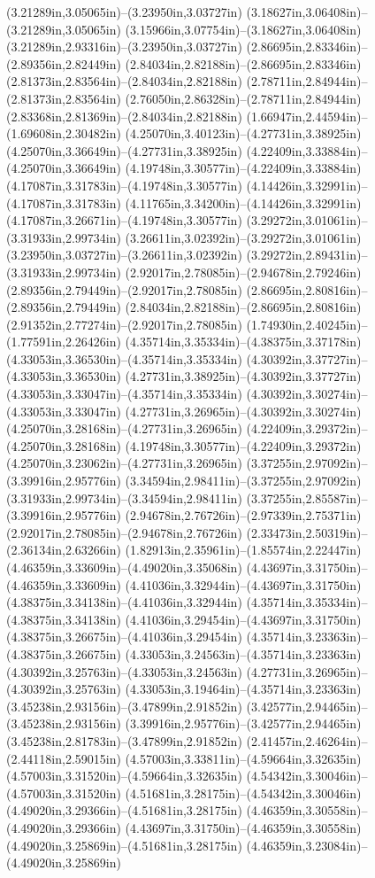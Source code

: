 (3.21289in,3.05065in)--(3.23950in,3.03727in) (3.18627in,3.06408in)--(3.21289in,3.05065in) (3.15966in,3.07754in)--(3.18627in,3.06408in) (3.21289in,2.93316in)--(3.23950in,3.03727in) (2.86695in,2.83346in)--(2.89356in,2.82449in) (2.84034in,2.82188in)--(2.86695in,2.83346in) (2.81373in,2.83564in)--(2.84034in,2.82188in) (2.78711in,2.84944in)--(2.81373in,2.83564in) (2.76050in,2.86328in)--(2.78711in,2.84944in) (2.83368in,2.81369in)--(2.84034in,2.82188in) (1.66947in,2.44594in)--(1.69608in,2.30482in) (4.25070in,3.40123in)--(4.27731in,3.38925in) (4.25070in,3.36649in)--(4.27731in,3.38925in) (4.22409in,3.33884in)--(4.25070in,3.36649in) (4.19748in,3.30577in)--(4.22409in,3.33884in) (4.17087in,3.31783in)--(4.19748in,3.30577in) (4.14426in,3.32991in)--(4.17087in,3.31783in) (4.11765in,3.34200in)--(4.14426in,3.32991in) (4.17087in,3.26671in)--(4.19748in,3.30577in) (3.29272in,3.01061in)--(3.31933in,2.99734in) (3.26611in,3.02392in)--(3.29272in,3.01061in) (3.23950in,3.03727in)--(3.26611in,3.02392in) (3.29272in,2.89431in)--(3.31933in,2.99734in) (2.92017in,2.78085in)--(2.94678in,2.79246in) (2.89356in,2.79449in)--(2.92017in,2.78085in) (2.86695in,2.80816in)--(2.89356in,2.79449in) (2.84034in,2.82188in)--(2.86695in,2.80816in) (2.91352in,2.77274in)--(2.92017in,2.78085in) (1.74930in,2.40245in)--(1.77591in,2.26426in) (4.35714in,3.35334in)--(4.38375in,3.37178in) (4.33053in,3.36530in)--(4.35714in,3.35334in) (4.30392in,3.37727in)--(4.33053in,3.36530in) (4.27731in,3.38925in)--(4.30392in,3.37727in) (4.33053in,3.33047in)--(4.35714in,3.35334in) (4.30392in,3.30274in)--(4.33053in,3.33047in) (4.27731in,3.26965in)--(4.30392in,3.30274in) (4.25070in,3.28168in)--(4.27731in,3.26965in) (4.22409in,3.29372in)--(4.25070in,3.28168in) (4.19748in,3.30577in)--(4.22409in,3.29372in) (4.25070in,3.23062in)--(4.27731in,3.26965in) (3.37255in,2.97092in)--(3.39916in,2.95776in) (3.34594in,2.98411in)--(3.37255in,2.97092in) (3.31933in,2.99734in)--(3.34594in,2.98411in) (3.37255in,2.85587in)--(3.39916in,2.95776in) (2.94678in,2.76726in)--(2.97339in,2.75371in) (2.92017in,2.78085in)--(2.94678in,2.76726in) (2.33473in,2.50319in)--(2.36134in,2.63266in) (1.82913in,2.35961in)--(1.85574in,2.22447in) (4.46359in,3.33609in)--(4.49020in,3.35068in) (4.43697in,3.31750in)--(4.46359in,3.33609in) (4.41036in,3.32944in)--(4.43697in,3.31750in) (4.38375in,3.34138in)--(4.41036in,3.32944in) (4.35714in,3.35334in)--(4.38375in,3.34138in) (4.41036in,3.29454in)--(4.43697in,3.31750in) (4.38375in,3.26675in)--(4.41036in,3.29454in) (4.35714in,3.23363in)--(4.38375in,3.26675in) (4.33053in,3.24563in)--(4.35714in,3.23363in) (4.30392in,3.25763in)--(4.33053in,3.24563in) (4.27731in,3.26965in)--(4.30392in,3.25763in) (4.33053in,3.19464in)--(4.35714in,3.23363in) (3.45238in,2.93156in)--(3.47899in,2.91852in) (3.42577in,2.94465in)--(3.45238in,2.93156in) (3.39916in,2.95776in)--(3.42577in,2.94465in) (3.45238in,2.81783in)--(3.47899in,2.91852in) (2.41457in,2.46264in)--(2.44118in,2.59015in) (4.57003in,3.33811in)--(4.59664in,3.32635in) (4.57003in,3.31520in)--(4.59664in,3.32635in) (4.54342in,3.30046in)--(4.57003in,3.31520in) (4.51681in,3.28175in)--(4.54342in,3.30046in) (4.49020in,3.29366in)--(4.51681in,3.28175in) (4.46359in,3.30558in)--(4.49020in,3.29366in) (4.43697in,3.31750in)--(4.46359in,3.30558in) (4.49020in,3.25869in)--(4.51681in,3.28175in) (4.46359in,3.23084in)--(4.49020in,3.25869in) 